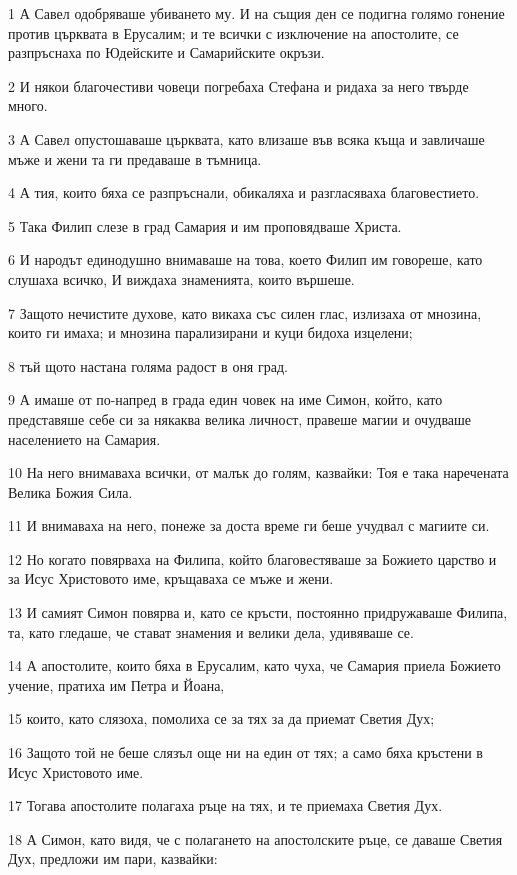 \par 1 А Савел одобряваше убиването му. И на същия ден се подигна голямо гонение против църквата в Ерусалим; и те всички с изключение на апостолите, се разпръснаха по Юдейските и Самарийските окръзи.
\par 2 И някои благочестиви човеци погребаха Стефана и ридаха за него твърде много.
\par 3 А Савел опустошаваше църквата, като влизаше във всяка къща и завличаше мъже и жени та ги предаваше в тъмница.
\par 4 А тия, които бяха се разпръснали, обикаляха и разгласяваха благовестието.
\par 5 Така Филип слезе в град Самария и им проповядваше Христа.
\par 6 И народът единодушно внимаваше на това, което Филип им говореше, като слушаха всичко, И виждаха знаменията, които вършеше.
\par 7 Защото нечистите духове, като викаха със силен глас, излизаха от мнозина, които ги имаха; и мнозина парализирани и куци бидоха изцелени;
\par 8 тъй щото настана голяма радост в оня град.
\par 9 А имаше от по-напред в града един човек на име Симон, който, като представяше себе си за някаква велика личност, правеше магии и очудваше населението на Самария.
\par 10 На него внимаваха всички, от малък до голям, казвайки: Тоя е така наречената Велика Божия Сила.
\par 11 И внимаваха на него, понеже за доста време ги беше учудвал с магиите си.
\par 12 Но когато повярваха на Филипа, който благовестяваше за Божието царство и за Исус Христовото име, кръщаваха се мъже и жени.
\par 13 И самият Симон повярва и, като се кръсти, постоянно придружаваше Филипа, та, като гледаше, че стават знамения и велики дела, удивяваше се.
\par 14 А апостолите, които бяха в Ерусалим, като чуха, че Самария приела Божието учение, пратиха им Петра и Йоана,
\par 15 които, като слязоха, помолиха се за тях за да приемат Светия Дух;
\par 16 Защото той не беше слязъл още ни на един от тях; а само бяха кръстени в Исус Христовото име.
\par 17 Тогава апостолите полагаха ръце на тях, и те приемаха Светия Дух.
\par 18 А Симон, като видя, че с полагането на апостолските ръце, се даваше Светия Дух, предложи им пари, казвайки:
